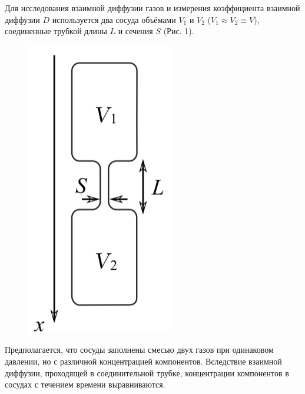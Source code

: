 \documentclass[a4paper,12pt]{article}
\theoremstyle{plain} %
\theoremstyle{definition} %
\theoremstyle{remark} %
\begin{document}
Для исследования взаимной диффузии газов и измерения коэффициента взаимной диффузии $D$ используется два сосуда объёмами $V_1$ и $V_2$ ($V_1\approx V_2 \equiv V$), соединенные трубкой длины $L$ и сечения $S$ (Рис. 1).
\begin{figure}
	\includegraphics[width=\linewidth]{1}
	\caption{}
\end{figure}
 Предполагается, что сосуды заполнены смесью двух газов при одинаковом давлении, но с различной концентрацией компонентов. Вследствие взаимной диффузии, проходящей в соединительной трубке, концентрации компонентов в сосудах с течением времени выравниваются.
 
\end{document}
